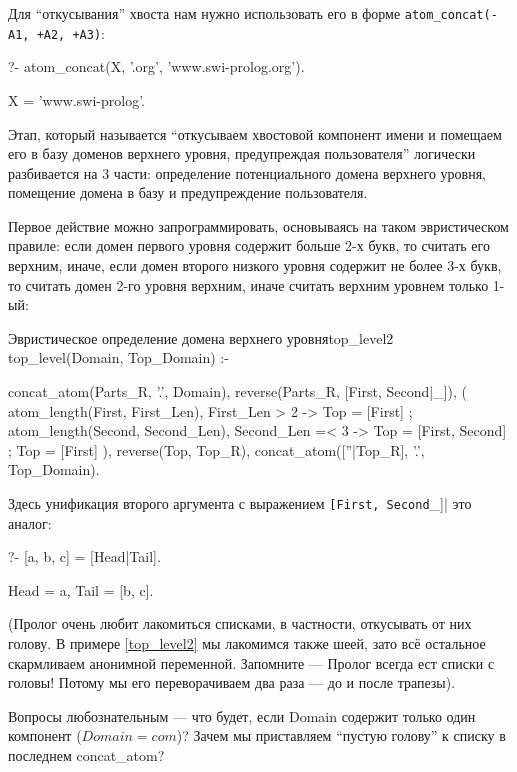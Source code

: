 \documentclass[a4paper]{book}
\begin{document}
Для ``откусывания'' хвоста нам нужно использовать его в форме
\verb|atom_concat(-A1, +A2, +A3)|:

\begin{example}{}{}
?- atom_concat(X, '.org', 'www.swi-prolog.org').

X = 'www.swi-prolog'.
\end{example}

Этап, который называется ``откусываем хвостовой компонент имени и
помещаем его в базу доменов верхнего уровня, предупреждая
пользователя'' логически разбивается на 3 части: определение
потенциального домена верхнего уровня, помещение домена в базу и
предупреждение пользователя.

Первое действие можно запрограммировать, основываясь на таком
эвристическом правиле: если домен первого уровня содержит больше
2-х букв, то считать его верхним, иначе, если домен второго низкого
уровня содержит не более 3-х букв, то считать домен 2-го уровня
верхним, иначе считать верхним уровнем только 1-ый:

\begin{example}{Эвристическое определение домена верхнего уровня}{top_level2}
top_level(Domain, Top_Domain) :-

  concat_atom(Parts_R, '.', Domain),
  reverse(Parts_R, [First, Second|_]),
  (  atom_length(First, First_Len), First_Len > 2
  -> Top = [First]
  ;  atom_length(Second, Second_Len), Second_Len =< 3
  -> Top = [First, Second]
  ;  Top = [First]
  ),
  reverse(Top, Top_R),
  concat_atom([''|Top_R], '.', Top_Domain).
\end{example}

Здесь унификация второго аргумента с выражением
\verb|[First, Second|_]| это аналог:

\begin{example}{}{}
?- [a, b, c] = [Head|Tail].

Head = a,
Tail = [b, c].
\end{example}

(Пролог очень любит лакомиться списками, в частности, откусывать
от них голову. В примере \ref{top_level2} мы лакомимся также
шеей, зато всё остальное скармливаем анонимной
переменной. Запомните --- Пролог всегда ест списки с головы!
Потому мы его переворачиваем два раза --- до и после трапезы).

Вопросы любознательным --- что будет, если Domain содержит только
один компонент ($Domain = com$)? Зачем мы приставляем ``пустую
голову'' к списку в последнем concat_atom?
\end{document}

